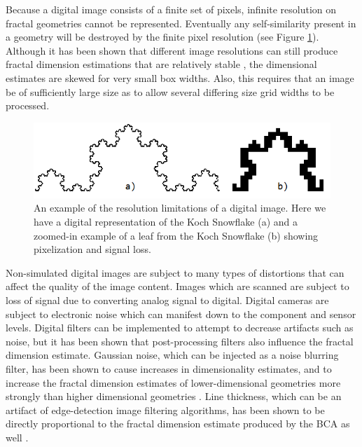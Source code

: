 \documentclass[12pt, oneside]{book}
\begin{document}
Because a digital image consists of a finite set of pixels, infinite resolution on fractal geometries cannot be represented.  Eventually any self-similarity present in a geometry will be destroyed by the finite pixel resolution (see Figure \ref{fig:pixelation}).  Although it has been shown that different image resolutions can still produce fractal dimension estimations that are relatively stable \cite{ahammer_how_2003}, the dimensional estimates are skewed for very small box widths.  Also, this requires that an image be of sufficiently large size as to allow several differing size grid widths to be processed.

\begin{figure}[!b]
  \centering
  \includegraphics[width=\textwidth]{figures/pixelation_fig.png}
  \caption[An example of the resolution limitations of a digital image.]{An example of the resolution limitations of a digital image.  Here we have a digital representation of the Koch Snowflake (a) and a zoomed-in example of a leaf from the Koch Snowflake (b) showing pixelization and signal loss.}
  \label{fig:pixelation}
\end{figure}

Non-simulated digital images are subject to many types of distortions that can affect the quality of the image content.  Images which are scanned are subject to loss of signal due to converting analog signal to digital.  Digital cameras are subject to electronic noise which can manifest down to the component and sensor levels.  Digital filters can be implemented to attempt to decrease artifacts such as noise, but it has been shown that post-processing filters also influence the fractal dimension estimate. Gaussian noise, which can be injected as a noise blurring filter, has been shown to cause increases in dimensionality estimates, and to increase the fractal dimension estimates of lower-dimensional geometries more strongly than higher dimensional geometries \cite{reiss_noise_2015}.  Line thickness, which can be an artifact of edge-detection image filtering algorithms, has been shown to be directly proportional to the fractal dimension estimate produced by the BCA as well \cite{ahammer_influence_2004}.  
\end{document}
